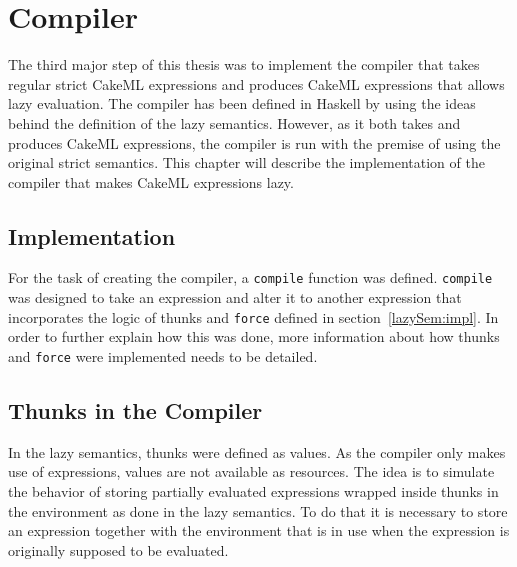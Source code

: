 \chapter{Compiler}
The third major step of this thesis was to implement the compiler that takes
regular strict CakeML expressions and produces CakeML expressions that allows
lazy evaluation. The compiler has been defined in Haskell by using the ideas
behind the definition of the lazy semantics. However, as it both takes and
produces CakeML expressions, the compiler is run with the premise of using the
original strict semantics. This chapter will describe the implementation of the
compiler that makes CakeML expressions lazy.

\section{Implementation}

For the task of creating the compiler, a \texttt{compile} function was defined.
\texttt{compile} was designed to take an expression and alter it to another
expression that incorporates the logic of thunks and \texttt{force} defined in
section~\ref{lazySem:impl}. In order to further explain how this was done,
more information about how thunks and \texttt{force} were implemented needs to
be detailed.

\section{Thunks in the Compiler}
\label{comp:thunk}
In the lazy semantics, thunks were defined as values. As the compiler only makes
use of expressions, values are not available as resources.
The idea is to simulate the behavior of storing
partially evaluated expressions wrapped inside thunks in the environment as
done in the lazy semantics. To do that it is necessary to store an expression
together with the environment that is in use when the expression is originally
supposed to be evaluated.

